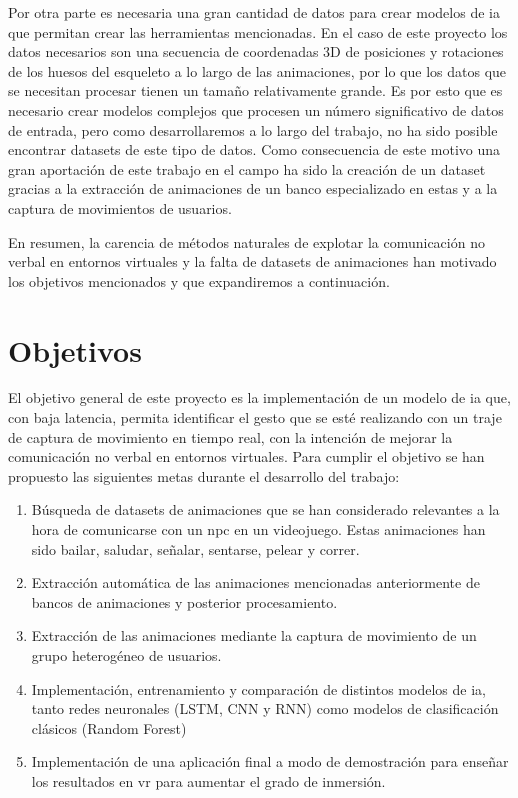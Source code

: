 Por otra parte es necesaria una gran cantidad de datos para crear modelos de \gls{ia} que permitan crear las herramientas mencionadas. 
En el caso de este proyecto los datos necesarios son una secuencia de coordenadas 3D de posiciones y rotaciones de los huesos del esqueleto a lo largo de las animaciones, por lo que los datos que se necesitan procesar tienen un tamaño relativamente grande.
Es por esto que es necesario crear modelos complejos que procesen un número significativo de datos de entrada, pero como desarrollaremos a lo largo del trabajo, no ha sido posible encontrar datasets de este tipo de datos.
Como consecuencia de este motivo una gran aportación de este trabajo en el campo ha sido la creación de un dataset gracias a la extracción de animaciones de un banco especializado en estas y a la captura de movimientos de usuarios.

En resumen, la carencia de métodos naturales de explotar la comunicación no verbal en entornos virtuales y la falta de datasets de animaciones han motivado los objetivos mencionados y que expandiremos a continuación.
\section{Objetivos}
El objetivo general de este proyecto es la implementación de un modelo de \gls{ia} que, con baja latencia, permita identificar el gesto que se esté realizando con un traje de captura de movimiento en tiempo real, con la intención de mejorar la comunicación no verbal en entornos virtuales.
Para cumplir el objetivo se han propuesto las siguientes metas durante el desarrollo del trabajo:
\begin{enumerate}
	\item Búsqueda de datasets de animaciones que se han considerado relevantes a la hora de comunicarse con un \gls{npc} en un videojuego. Estas animaciones han sido bailar, saludar, señalar, sentarse, pelear y correr.
	\item Extracción automática de las animaciones mencionadas anteriormente de bancos de animaciones y posterior procesamiento.
	\item Extracción de las animaciones mediante la captura de movimiento de un grupo heterogéneo de usuarios.
	\item Implementación, entrenamiento y comparación de distintos modelos de \gls{ia}, tanto redes neuronales (LSTM, CNN y RNN) como modelos de clasificación clásicos (Random Forest)
	\item Implementación de una aplicación final a modo de demostración para enseñar los resultados en \gls{vr} para aumentar el grado de inmersión.
\end{enumerate}

